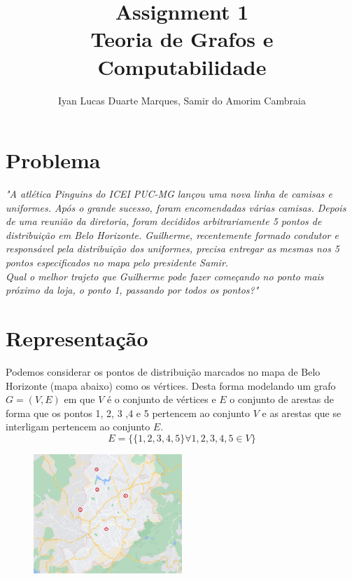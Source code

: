 \documentclass[12pt]{article}
\title{Assignment 1 \\ Teoria de Grafos e Computabilidade}
\author{Iyan Lucas Duarte Marques\inst{1}, Samir do Amorim Cambraia\inst{1}}
\begin{document}
\maketitle

\section{Problema}
\textit{"A atlética Pinguins do ICEI PUC-MG lançou uma nova linha de camisas e uniformes.
Após o grande sucesso,  foram encomendadas várias camisas.
Depois de uma reunião da diretoria, foram decididos arbitrariamente 5 pontos de distribuição em Belo Horizonte.
Guilherme, recentemente formado condutor e responsável pela distribuição dos uniformes, precisa entregar as mesmas nos 5 pontos especificados no mapa pelo presidente Samir.\\
Qual o melhor trajeto que Guilherme pode fazer começando no ponto mais próximo da loja, o ponto 1, passando por todos os pontos?"}

\section{Representação}
Podemos considerar os pontos de distribuição marcados no mapa de Belo Horizonte (mapa abaixo) como os vértices.
Desta forma modelando um grafo $G = (V, E)$ em que $V$ é o conjunto de vértices e $E$ o conjunto de arestas
de forma que os pontos 1, 2, 3 ,4 e 5 pertencem ao conjunto $V$ e as arestas que se interligam pertencem ao conjunto $E$.
\begin{equation}
    E = \{\{1, 2, 3, 4, 5\} \forall 1, 2, 3, 4, 5 \in V\}
\end{equation}

    \begin{figure}[h!]
        \includegraphics[width=0.5\textwidth]{imagens/grafos1.jpeg}
    \end{figure}
\end{document}
